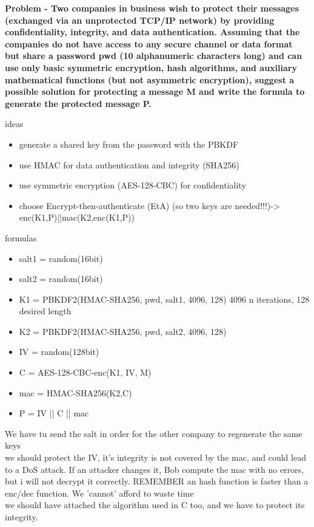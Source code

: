\textbf{Problem - Two companies in business wish to protect their messages
(exchanged via an unprotected TCP/IP network) by
providing confidentiality, integrity, and data authentication.
Assuming that the companies do not have access to any
secure channel or data format but share a password pwd
(10 alphanumeric characters long) and can use only basic
symmetric encryption, hash algorithms, and auxiliary
mathematical functions (but not asymmetric encryption),
suggest a possible solution for protecting a message M and
write the formula to generate the protected message P.\\}

ideas
\begin{itemize}
    \item generate a shared key from the password with the PBKDF
    \item use HMAC for data authentication and integrity (SHA256)
    \item use symmetric encryption (AES-128-CBC) for confidentiality
    \item choose Encrypt-then-authenticate (EtA) (so two keys are needed!!!)-> enc(K1,P)||mac(K2,enc(K1,P))
\end{itemize}
formulas
\begin{itemize}
    \item salt1 = random(16bit)
    \item salt2 = random(16bit)
    \item K1 = PBKDF2(HMAC-SHA256, pwd, salt1, 4096, 128) \textcolor{Comment}{4096 n iterations, 128 desired length}
    \item K2 = PBKDF2(HMAC-SHA256, pwd, salt2, 4096, 128)
    \item IV = random(128bit)
    \item C = AES-128-CBC-enc(K1, IV, M)
    \item mac = HMAC-SHA256(K2,C)
    \item P = IV || C || mac
\end{itemize}
\textcolor{Comment}{We have tu send the salt in order for the other company to regenerate the same keys\\
we should protect the IV, it's integrity is not covered by the mac, and could lead to a DoS attack. If an attacker changes it,  
Bob compute the mac with no errors, but i will not decrypt it correctly. REMEMBER an hash function is faster than a enc/dec function. We 'cannot' afford
to waste time\\ 
we should have attached the algorithm used in C too, and we have to protect its integrity.}
